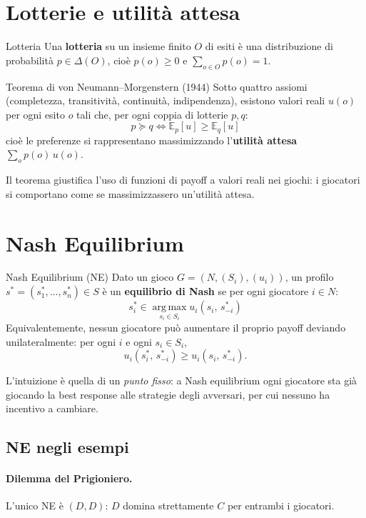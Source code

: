 \documentclass[12pt,a4paper,twoside]{book}
\theoremstyle{plain}
\theoremstyle{definition}
\newcommand{\argmax}{\operatorname*{arg\,max}}
\begin{document}
\section{Lotterie e utilità attesa}

\begin{defbox}{Lotteria}
Una \textbf{lotteria} su un insieme finito $O$ di esiti è una distribuzione di probabilità $p\in\Delta(O)$, cioè $p(o)\ge 0$ e $\sum_{o\in O}p(o)=1$.
\end{defbox}

\begin{thmbox}{Teorema di von Neumann--Morgenstern (1944)}
Sotto quattro assiomi (completezza, transitività, continuità, indipendenza), esistono valori reali $u(o)$ per ogni esito $o$ tali che, per ogni coppia di lotterie $p,q$:
\[
  p \succcurlyeq q \iff \mathbb{E}_p[u] \ge \mathbb{E}_q[u]
\]
cioè le preferenze si rappresentano massimizzando l'\textbf{utilità attesa} $\sum_o p(o)\,u(o)$.
\end{thmbox}

Il teorema giustifica l'uso di funzioni di payoff a valori reali nei giochi: i giocatori si comportano come se massimizzassero un'utilità attesa.

\section{Nash Equilibrium}

\begin{defbox}{Nash Equilibrium (NE)}
Dato un gioco $G=(N,(S_i),(u_i))$, un profilo $s^* = (s^*_1,\dots,s^*_n)\in S$ è un \textbf{equilibrio di Nash} se per ogni giocatore $i\in N$:
\[
  s^*_i \in \argmax_{s_i\in S_i} u_i(s_i,\, s^*_{-i})
\]
Equivalentemente, nessun giocatore può aumentare il proprio payoff deviando unilateralmente: per ogni $i$ e ogni $s_i\in S_i$,
\[
  u_i(s^*_i,\, s^*_{-i}) \ge u_i(s_i,\, s^*_{-i}).
\]
\end{defbox}

L'intuizione è quella di un \emph{punto fisso}: a Nash equilibrium ogni giocatore sta già giocando la best response alle strategie degli avversari, per cui nessuno ha incentivo a cambiare.

\subsection{NE negli esempi}

\paragraph{Dilemma del Prigioniero.} L'unico NE è $(D,D)$: $D$ domina strettamente $C$ per entrambi i giocatori.
\end{document}
